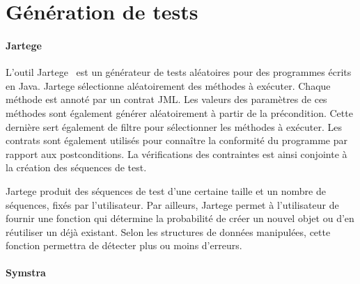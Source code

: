 %
%
%
%
%

\section{Génération de tests}

\paragraph{Jartege} L'outil Jartege~ est un générateur de tests
aléatoires pour des programmes écrits en Java. Jartege sélectionne aléatoirement
des méthodes à exécuter. Chaque méthode est annoté par un contrat JML. Les
valeurs des paramètres de ces méthodes sont également générer aléatoirement à
partir de la précondition. Cette dernière sert également de filtre pour
sélectionner les méthodes à exécuter. Les contrats sont également utilisés pour
connaître la conformité du programme par rapport aux postconditions. La
vérifications des contraintes est ainsi conjointe à la création des séquences de
test.

Jartege produit des séquences de test d'une certaine taille et un nombre de
séquences, fixés par l'utilisateur. Par ailleurs, Jartege permet à l'utilisateur
de fournir une fonction qui détermine la probabilité de créer un nouvel objet ou
d'en réutiliser un déjà existant. Selon les structures de données manipulées,
cette fonction permettra de détecter plus ou moins d'erreurs.

\paragraph{Symstra}

